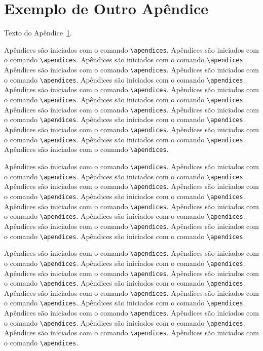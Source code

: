 \chapter{Exemplo de Outro Apêndice}
\label{apend:2}
Texto do Apêndice~\ref{apend:2}.

Apêndices são iniciados com o comando \verb|\apendices|.
Apêndices são iniciados com o comando \verb|\apendices|.
Apêndices são iniciados com o comando \verb|\apendices|.
Apêndices são iniciados com o comando \verb|\apendices|.
Apêndices são iniciados com o comando \verb|\apendices|.
Apêndices são iniciados com o comando \verb|\apendices|.
Apêndices são iniciados com o comando \verb|\apendices|.
Apêndices são iniciados com o comando \verb|\apendices|.
Apêndices são iniciados com o comando \verb|\apendices|.
Apêndices são iniciados com o comando \verb|\apendices|.
Apêndices são iniciados com o comando \verb|\apendices|.
Apêndices são iniciados com o comando \verb|\apendices|.
Apêndices são iniciados com o comando \verb|\apendices|.
Apêndices são iniciados com o comando \verb|\apendices|.
Apêndices são iniciados com o comando \verb|\apendices|.
Apêndices são iniciados com o comando \verb|\apendices|.

Apêndices são iniciados com o comando \verb|\apendices|.
Apêndices são iniciados com o comando \verb|\apendices|.
Apêndices são iniciados com o comando \verb|\apendices|.
Apêndices são iniciados com o comando \verb|\apendices|.
Apêndices são iniciados com o comando \verb|\apendices|.
Apêndices são iniciados com o comando \verb|\apendices|.
Apêndices são iniciados com o comando \verb|\apendices|.
Apêndices são iniciados com o comando \verb|\apendices|.
Apêndices são iniciados com o comando \verb|\apendices|.
Apêndices são iniciados com o comando \verb|\apendices|.
Apêndices são iniciados com o comando \verb|\apendices|.
Apêndices são iniciados com o comando \verb|\apendices|.

Apêndices são iniciados com o comando \verb|\apendices|.
Apêndices são iniciados com o comando \verb|\apendices|.
Apêndices são iniciados com o comando \verb|\apendices|.
Apêndices são iniciados com o comando \verb|\apendices|.
Apêndices são iniciados com o comando \verb|\apendices|.
Apêndices são iniciados com o comando \verb|\apendices|.
Apêndices são iniciados com o comando \verb|\apendices|.
Apêndices são iniciados com o comando \verb|\apendices|.
Apêndices são iniciados com o comando \verb|\apendices|.
Apêndices são iniciados com o comando \verb|\apendices|.
Apêndices são iniciados com o comando \verb|\apendices|.
Apêndices são iniciados com o comando \verb|\apendices|.
Apêndices são iniciados com o comando \verb|\apendices|.
Apêndices são iniciados com o comando \verb|\apendices|.

